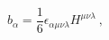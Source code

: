 \begin{equation}
b_{\alpha }=\frac{1}{6}\epsilon _{\alpha \mu \nu \lambda }H^{\mu \nu \lambda
}\ ,
\end{equation}%
